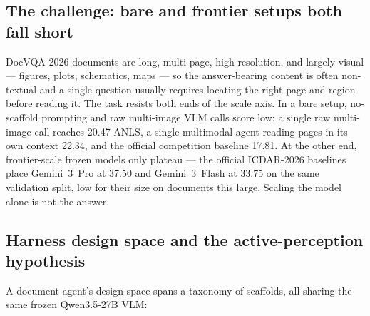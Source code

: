 \subsection{The challenge: bare and frontier setups both fall short}

DocVQA-2026 documents are long, multi-page, high-resolution, and largely visual --- figures, plots, schematics, maps --- so the answer-bearing content is often non-textual and a single question usually requires locating the right page and region before reading it. The task resists both ends of the scale axis. In a bare setup, no-scaffold prompting and raw multi-image VLM calls score low: a single raw multi-image call reaches 20.47 ANLS, a single multimodal agent reading pages in its own context 22.34, and the official competition baseline 17.81. At the other end, frontier-scale frozen models only plateau --- the official ICDAR-2026 baselines place Gemini~3~Pro at 37.50 and Gemini~3~Flash at 33.75 on the same validation split, low for their size on documents this large. Scaling the model alone is not the answer.

\subsection{Harness design space and the active-perception hypothesis}

A document agent's design space spans a taxonomy of scaffolds, all sharing the same frozen Qwen3.5-27B VLM:

